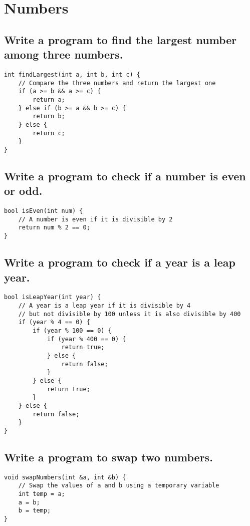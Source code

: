 \section{Numbers}

\subsection{Write a program to find the largest number among three numbers.}
\begin{tcolorbox}[title=]
\begin{verbatim}
int findLargest(int a, int b, int c) {
    // Compare the three numbers and return the largest one
    if (a >= b && a >= c) {
        return a;
    } else if (b >= a && b >= c) {
        return b;
    } else {
        return c;
    }
}
\end{verbatim}
\end{tcolorbox}

\subsection{Write a program to check if a number is even or odd.}
\begin{tcolorbox}[title=]
\begin{verbatim}
bool isEven(int num) {
    // A number is even if it is divisible by 2
    return num % 2 == 0;
}
\end{verbatim}
\end{tcolorbox}

\subsection{Write a program to check if a year is a leap year.}
\begin{tcolorbox}[title=]
\begin{verbatim}
bool isLeapYear(int year) {
    // A year is a leap year if it is divisible by 4
    // but not divisible by 100 unless it is also divisible by 400
    if (year % 4 == 0) {
        if (year % 100 == 0) {
            if (year % 400 == 0) {
                return true;
            } else {
                return false;
            }
        } else {
            return true;
        }
    } else {
        return false;
    }
}
\end{verbatim}
\end{tcolorbox}

\subsection{Write a program to swap two numbers.}
\begin{tcolorbox}[title=]
\begin{verbatim}
void swapNumbers(int &a, int &b) {
    // Swap the values of a and b using a temporary variable
    int temp = a;
    a = b;
    b = temp;
}
\end{verbatim}
\end{tcolorbox}

